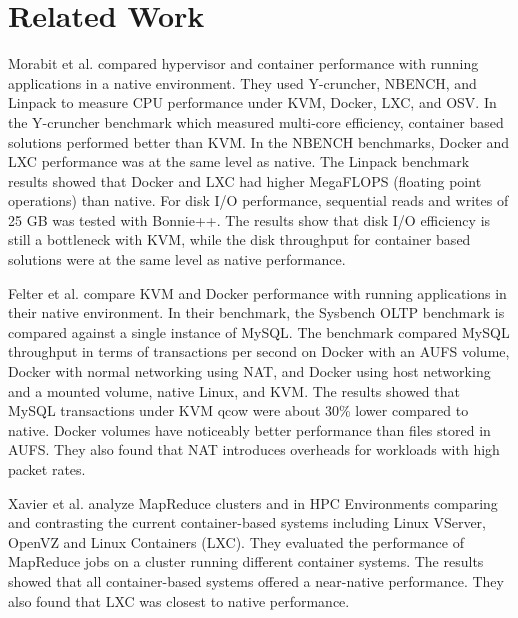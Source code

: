 \documentclass[11pt]{article}
\begin{document}
	\section{Related Work}
	Morabit et al. \cite{morabito} compared hypervisor and container performance with running applications in a native environment. They used Y-cruncher, NBENCH, and Linpack to measure CPU performance under KVM, Docker, LXC, and OSV. In the Y-cruncher benchmark which measured multi-core efficiency, container based solutions performed better than KVM. In the NBENCH benchmarks, Docker and LXC performance was at the same level as native. The Linpack benchmark results showed that Docker and LXC had higher MegaFLOPS (floating point operations) than native. For disk I/O performance, sequential reads and writes of 25 GB was tested with Bonnie++. The results show that disk I/O efficiency is still a bottleneck with KVM, while the disk throughput for container based solutions were at the same level as native performance.
	
	Felter et al. \cite{felter} compare KVM and Docker performance with running applications in their native environment. In their benchmark, the Sysbench OLTP benchmark is compared against a single instance of MySQL. The benchmark compared MySQL throughput in terms of transactions per second on Docker with an AUFS volume, Docker with normal networking using NAT, and Docker using host networking and a mounted volume, native Linux, and KVM. The results showed that MySQL transactions under KVM qcow were about 30\% lower compared to native. Docker volumes have noticeably better performance than files stored in AUFS. They also found that NAT introduces overheads for workloads with high packet rates.
	
	Xavier et al. \cite{xavier} analyze MapReduce clusters and in HPC Environments comparing and contrasting the current container-based systems including Linux VServer, OpenVZ and Linux Containers (LXC). They evaluated the performance of MapReduce jobs on a cluster running different container systems. The results showed that all container-based systems offered a near-native performance. They also found that LXC was closest to native performance.
	
\end{document}
